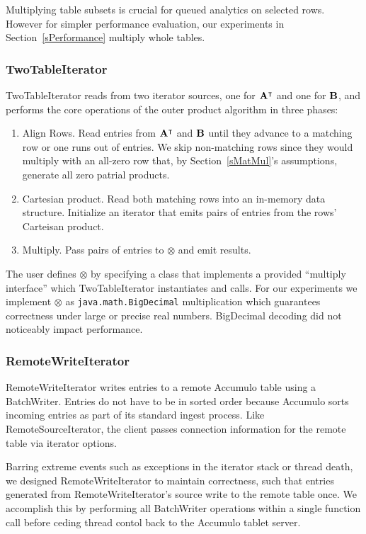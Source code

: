 Multiplying table subsets is crucial for queued analytics on selected rows.
However for simpler performance evaluation, 
our experiments in Section~\ref{sPerformance} multiply whole tables.

\subsubsection{TwoTableIterator}
TwoTableIterator reads from two iterator sources, one for $\mathbf{A^{\intercal}}$ and one for $\mathbf{B}$,
and performs the core operations of the outer product algorithm in three phases:
\begin{enumerate}
\item Align Rows.  Read entries from $\mathbf{A^{\intercal}}$ and $\mathbf{B}$ until they advance to a matching row
or one runs out of entries. We skip non-matching rows 
since they would multiply with an all-zero row that, by Section~\ref{sMatMul}'s assumptions,
generate all zero patrial products.
\item Cartesian product. Read both matching rows into an in-memory data structure. 
Initialize an iterator that emits pairs of entries from the rows' Carteisan product.
\item Multiply. Pass pairs of entries to $\otimes$ and emit results. 
\end{enumerate}

The user defines $\otimes$ by specifying a class that implements a provided ``multiply interface''
which TwoTableIterator instantiates and calls. 
For our experiments we implement $\otimes$ as \texttt{java.math.BigDecimal} multiplication
which guarantees correctness under large or precise real numbers.
BigDecimal decoding did not noticeably impact performance.

\subsubsection{RemoteWriteIterator}
RemoteWriteIterator writes entries to a remote Accumulo table using a BatchWriter. %
Entries do not have to be in sorted order because Accumulo sorts incoming entries as part of its
standard ingest process. Like RemoteSourceIterator, the client passes connection information 
for the remote table via iterator options.

Barring extreme events such as exceptions in the iterator stack or thread death,
we designed RemoteWriteIterator to maintain correctness, such that entries generated from
RemoteWriteIterator's source write to the remote table once.
We accomplish this by performing all BatchWriter operations within a single function call
before ceding thread contol back to the Accumulo tablet server.  

